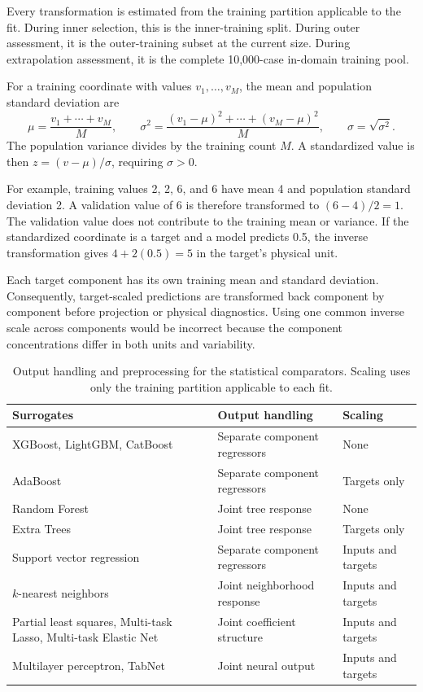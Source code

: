 Every transformation is estimated from the training partition applicable to the fit. During inner selection, this is the inner-training split. During outer assessment, it is the outer-training subset at the current size. During extrapolation assessment, it is the complete 10,000-case in-domain training pool.

For a training coordinate with values $v_1,\ldots,v_M$, the mean and population standard deviation are
\[
\mu=\frac{v_1+\cdots+v_M}{M},\qquad
\sigma^2=\frac{(v_1-\mu)^2+\cdots+(v_M-\mu)^2}{M},\qquad
\sigma=\sqrt{\sigma^2}.
\]
The population variance divides by the training count $M$. A standardized value is then
$z=(v-\mu)/\sigma$, requiring $\sigma>0$.

For example, training values 2, 2, 6, and 6 have mean 4 and population standard deviation 2. A validation value of 6 is therefore transformed to
$(6-4)/2=1$.
The validation value does not contribute to the training mean or variance. If the standardized coordinate is a target and a model predicts 0.5, the inverse transformation gives
$4+2(0.5)=5$
in the target's physical unit.

Each target component has its own training mean and standard deviation. Consequently, target-scaled predictions are transformed back component by component before projection or physical diagnostics. Using one common inverse scale across components would be incorrect because the component concentrations differ in both units and variability.

\begin{table}[htbp]
\centering
\caption{Output handling and preprocessing for the statistical comparators. Scaling uses only the training partition applicable to each fit.}
\label{tab:surrogate_preprocessing}
\small
\begin{tabular}{p{5.1cm}p{3.2cm}p{3.3cm}}
\toprule
Surrogates & Output handling & Scaling\\
\midrule
XGBoost, LightGBM, CatBoost & Separate component regressors & None\\
AdaBoost & Separate component regressors & Targets only\\
Random Forest & Joint tree response & None\\
Extra Trees & Joint tree response & Targets only\\
Support vector regression & Separate component regressors & Inputs and targets\\
$k$-nearest neighbors & Joint neighborhood response & Inputs and targets\\
Partial least squares, Multi-task Lasso, Multi-task Elastic Net & Joint coefficient structure & Inputs and targets\\
Multilayer perceptron, TabNet & Joint neural output & Inputs and targets\\
\bottomrule
\end{tabular}
\end{table}

